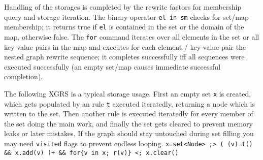 \noindent Handling of the storages is completed by the rewrite factors for membership query and storage iteration.
The binary operator \texttt{el in sm} checks for set/map membership; it returns true if \texttt{el} is contained in the set or the domain of the map, otherwise false.
The \texttt{for} command iterates over all elements in the set or all key-value pairs in the map and executes for each element / key-value pair the nested graph rewrite sequence; it completes successfully iff all sequences were executed successfully (an empty set/map causes immediate successful completion).

\begin{example}
The following XGRS is a typical storage usage.
First an empty set \texttt{x} is created, which gets populated by an rule \texttt{t} executed iteratedly, returning a node which is written to the set.
Then another rule is executed iteratedly for every member of the set doing the main work, and finally the set gets cleared to prevent memory leaks or later mistakes.
If the graph should stay untouched during set filling you may need \texttt{visited} flags to prevent endless looping.
\verb#x=set<Node> ;> ( (v)=t() && x.add(v) )+ && for{v in x; r(v)} <; x.clear()#
\end{example}


